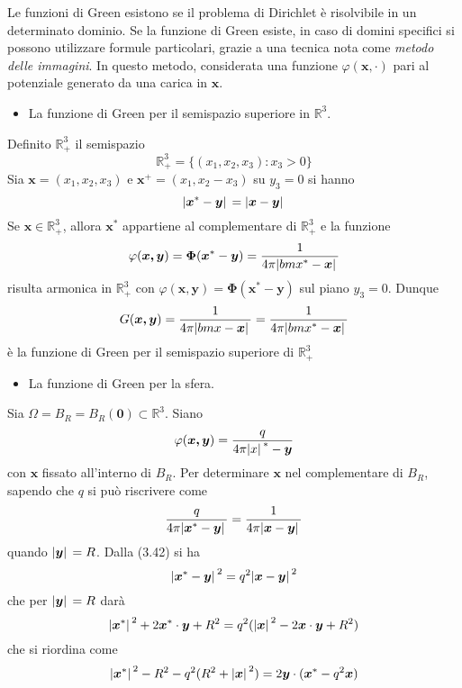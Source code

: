 \documentclass[a4paper,12pt, draft]{article}
\theoremstyle{break}
\let\phi\varphi
\numberwithin{equation}{section}
\begin{document}
Le funzioni di Green esistono se il problema di Dirichlet è risolvibile in un determinato dominio. Se la funzione di Green esiste, in caso di domini specifici si possono utilizzare formule particolari, grazie a una tecnica nota come \emph{metodo delle immagini}. In questo metodo, considerata una funzione \(\phi(\bm{x, \cdot})\) pari al potenziale generato da una carica in \(\bm{x}\). 
\begin{itemize}
  \item La funzione di Green per il semispazio superiore in \(\mathbb{R}^3\). 
\end{itemize}
Definito \(\mathbb{R}^3_+\) il semispazio
  \[
    \mathbb{R}^3_+ = \{(x_1, x_2, x_3): x_3 > 0\}
  \] 
  Sia \(\bm{x} = (x_1, x_2, x_3)\) e \(\bm{x}^+ = (x_1, x_2 -x_3)\) su \(y_3 = 0\) si hanno
  \[
    \abs*{\bm{x}^* - \bm{y}} = \abs*{\bm{x} - \bm{y}}
  \]  
Se \(\bm{x} \in \mathbb{R}^3_+\), allora \(\bm{x}^*\) appartiene al complementare di \(\mathbb{R}^3_+\) e la funzione 
\[
  \phi(\bm{x, y}) = \bm{\Phi} (\bm{x}^* - \bm{y}) = \frac{1}{4\pi\abs*{bm{x}^* - \bm{x}}} 
\]
risulta armonica in \(\mathbb{R}^3_+\) con \(\phi(\bm{x, y}) = \bm{\Phi} (\bm{x}^* - \bm{y})\) sul piano \(y_3 = 0\). Dunque 
\begin{equation}
  G(\bm{x, y}) = \frac{1}{4\pi\abs*{bm{x} - \bm{x}}} = \frac{1}{4\pi\abs*{bm{x}^* - \bm{x}}} 
\end{equation}
è la funzione di Green per il semispazio superiore di \(\mathbb{R}^3_+\)
\begin{itemize}
  \item La funzione di Green per la sfera.
\end{itemize}
Sia \(\Omega = B_R = B_R(\bm{0}) \subset \mathbb{R}^3\). Siano 
\[
  \phi(\bm{x, y}) = \frac{q}{4\pi \abs*{x}^* - \bm{y}}
\]
con \(\bm{x}\) fissato all'interno di \(B_R\). Per determinare \(\bm{x}\) nel complementare di \(B_R\), sapendo che \(q\) si può riscrivere come 
\begin{equation}
  \frac{q}{4\pi\abs*{\bm{x}^* - \bm{y}}} = \frac{1}{4\pi \abs*{\bm{x} - \bm{y}}}
\end{equation}
quando \(\abs*{\bm{y}} = R\). Dalla (3.42) si ha 
\begin{equation}
  \abs*{\bm{x}^* - \bm{y}}^2 = q^2 \abs*{\bm{x} - \bm{y}}^2
\end{equation}
che per \(\abs*{\bm{y}} = R\) darà 
\[
  \abs*{\bm{x}^*}^2 + 2\bm{x}^*\cdot\bm{y} + R^2 = q^2(\abs*{\bm{x}}^2 - 2\bm{x} \cdot \bm{y} + R^2)
\]
che si riordina come
\[
  \abs*{\bm{x}^*}^2 - R^2 - q^2(R^2 + \abs*{\bm{x}}^2) = 2\bm{y} \cdot (\bm{x}^* - q^2\bm{x})
\]
\end{document}
